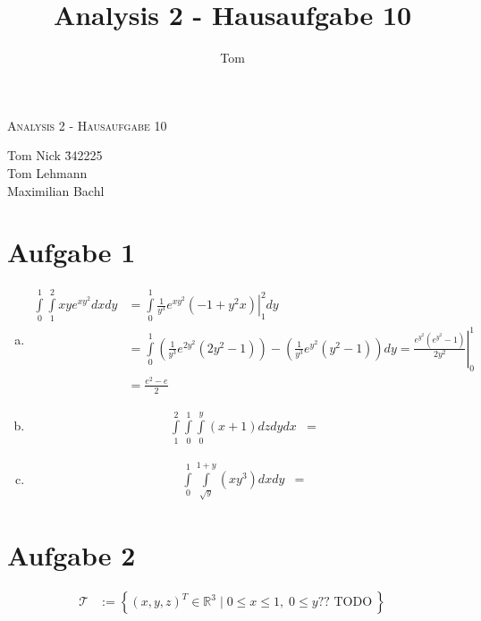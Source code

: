 \documentclass[10pt,a4paper,parskip=half]{scrartcl}
\author{Tom}
\title{Analysis 2 - Hausaufgabe 10}
\newcommand{\R}{\mathbb{R}}
\begin{document}
\begin{center}
\textsc{\Large{Analysis 2 - Hausaufgabe 10}} \\
\end{center}
\begin{tabbing}
Tom Nick \hspace{1.4cm}\= 342225\\
Tom Lehmann\\
Maximilian Bachl
\end{tabbing}
\section*{Aufgabe 1}
\begin{enumerate}[a)]
   \item 
            \begin{align*}
               \int\limits^{1}_0\int\limits^{2}_{1}xye^{xy^2} dxdy &= \int\limits^{1}_0 \left. \frac{1}{y^3}e^{xy^2}(-1 + y^2x)\right|_{1}^{2} dy \\ 
               &=   \int\limits^{1}_0 (\frac{1}{y^3}e^{2y^2}(2y^2 - 1)) - (\frac{1}{y^3}e^{y^2}(y^2 - 1)) dy = \left. \frac{e^{y^2}(e^{y^2} -1)}{2y^2} \right|_0^1\\
               &= \frac{e^2 -e}{2}
            \end{align*}
   \item 
            \begin{align*}
               \int\limits^{2}_{1}\int\limits^1_0\int\limits^y_0(x+1) dzdydx &=
            \end{align*}
   \item 
            \begin{align*}
               \int\limits^{1}_{0}\int\limits^{1+y}_{\sqrt{y}}(xy^3) dxdy &=
            \end{align*}
\end{enumerate}
\section*{Aufgabe 2}
\begin{align*}
\mathcal{T} &:= \left\lbrace (x,y,z)^T \in \R^3 \mid 0\leq x \leq 1, \; 0\leq y \text{?? TODO}\ \right\rbrace
\end{align*}
\end{document}
